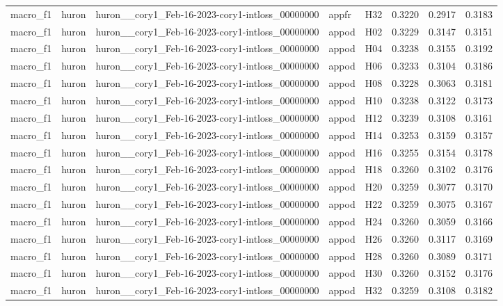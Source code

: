 \begin{table}[tbp]
\begin{tabular}{lllllrrr}
macro\_f1 & huron & huron\_\_cory1\_Feb-16-2023-cory1-intloss\_00000000 & appfr & H32 & 0.3220 & 0.2917 & 0.3183 \\
macro\_f1 & huron & huron\_\_cory1\_Feb-16-2023-cory1-intloss\_00000000 & appod & H02 & 0.3229 & 0.3147 & 0.3151 \\
macro\_f1 & huron & huron\_\_cory1\_Feb-16-2023-cory1-intloss\_00000000 & appod & H04 & 0.3238 & 0.3155 & 0.3192 \\
macro\_f1 & huron & huron\_\_cory1\_Feb-16-2023-cory1-intloss\_00000000 & appod & H06 & 0.3233 & 0.3104 & 0.3186 \\
macro\_f1 & huron & huron\_\_cory1\_Feb-16-2023-cory1-intloss\_00000000 & appod & H08 & 0.3228 & 0.3063 & 0.3181 \\
macro\_f1 & huron & huron\_\_cory1\_Feb-16-2023-cory1-intloss\_00000000 & appod & H10 & 0.3238 & 0.3122 & 0.3173 \\
macro\_f1 & huron & huron\_\_cory1\_Feb-16-2023-cory1-intloss\_00000000 & appod & H12 & 0.3239 & 0.3108 & 0.3161 \\
macro\_f1 & huron & huron\_\_cory1\_Feb-16-2023-cory1-intloss\_00000000 & appod & H14 & 0.3253 & 0.3159 & 0.3157 \\
macro\_f1 & huron & huron\_\_cory1\_Feb-16-2023-cory1-intloss\_00000000 & appod & H16 & 0.3255 & 0.3154 & 0.3178 \\
macro\_f1 & huron & huron\_\_cory1\_Feb-16-2023-cory1-intloss\_00000000 & appod & H18 & 0.3260 & 0.3102 & 0.3176 \\
macro\_f1 & huron & huron\_\_cory1\_Feb-16-2023-cory1-intloss\_00000000 & appod & H20 & 0.3259 & 0.3077 & 0.3170 \\
macro\_f1 & huron & huron\_\_cory1\_Feb-16-2023-cory1-intloss\_00000000 & appod & H22 & 0.3259 & 0.3075 & 0.3167 \\
macro\_f1 & huron & huron\_\_cory1\_Feb-16-2023-cory1-intloss\_00000000 & appod & H24 & 0.3260 & 0.3059 & 0.3166 \\
macro\_f1 & huron & huron\_\_cory1\_Feb-16-2023-cory1-intloss\_00000000 & appod & H26 & 0.3260 & 0.3117 & 0.3169 \\
macro\_f1 & huron & huron\_\_cory1\_Feb-16-2023-cory1-intloss\_00000000 & appod & H28 & 0.3260 & 0.3089 & 0.3171 \\
macro\_f1 & huron & huron\_\_cory1\_Feb-16-2023-cory1-intloss\_00000000 & appod & H30 & 0.3260 & 0.3152 & 0.3176 \\
macro\_f1 & huron & huron\_\_cory1\_Feb-16-2023-cory1-intloss\_00000000 & appod & H32 & 0.3259 & 0.3108 & 0.3182 \\

\end{tabular}
\end{table}
